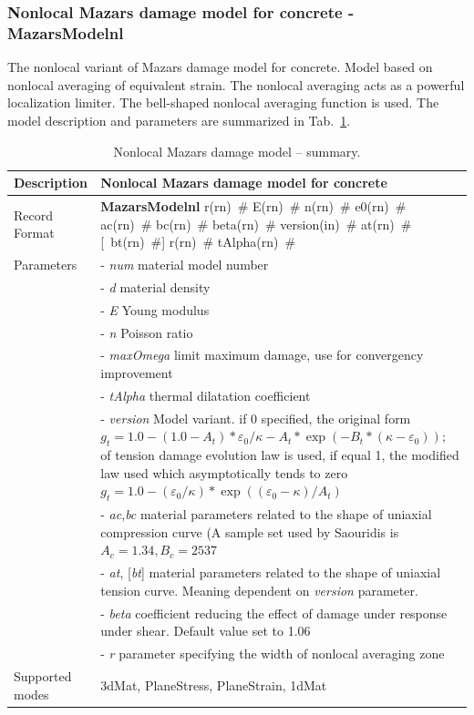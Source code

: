 \documentclass[a4paper]{article}
\newcommand{\descitem}[1]{{\noindent \bf #1}}
\newcommand{\elemparam}[2]{{{#1\tiny (#2)}~\#}}
\newcommand{\optelemparam}[2]{[{~\elemparam{#1}{#2}}]}
\newcommand{\param}[1]{{\it #1}}
\newcommand{\optparam}[1]{[{\it #1}]}
\begin{document}
\subsubsection{Nonlocal Mazars damage model for concrete - MazarsModelnl}
The nonlocal variant of Mazars damage model for concrete.
Model based on nonlocal averaging of equivalent strain.
The nonlocal averaging acts as a powerful localization
limiter. The bell-shaped nonlocal averaging function is used.
The model description and parameters are summarized
in Tab.~\ref{maznl_table}.

\begin{table}[!htb]
\begin{tabular}{|l|p{9cm}|}
\hline
Description & Nonlocal Mazars damage model for concrete\\
\hline
Record Format & \descitem{MazarsModelnl} \elemparam{r}{rn} \elemparam{E}{rn}
\elemparam{n}{rn}  \elemparam{e0}{rn}
\elemparam{ac}{rn} \elemparam{bc}{rn} \elemparam{beta}{rn}
\elemparam{version}{in} \elemparam{at}{rn} \optelemparam{bt}{rn} \elemparam{r}{rn}
\elemparam{tAlpha}{rn} \\
Parameters &- \param{num} material model number\\
&- \param{d} material density\\
&- \param{E} Young modulus\\
&- \param{n} Poisson ratio\\
&- \param{maxOmega} limit maximum damage, use for convergency improvement\\
&- \param{tAlpha} thermal dilatation coefficient\\
&- \param{version} Model variant. if 0 specified, the original form
$g_t= 1.0-(1.0-A_t)*\varepsilon_0/\kappa - A_t*\exp(-B_t*(\kappa-\varepsilon_0));
$ of
tension damage evolution law is used, if equal 1, the modified law
used which asymptotically tends to zero
$g_t = 1.0-(\varepsilon_0/\kappa)*\exp((\varepsilon_0-\kappa)/A_t)$\\
&- \param{ac},\param{bc} material parameters related to the shape of
uniaxial compression curve (A sample set used by Saouridis is $A_c =
1.34, B_c = 2537$\\
&- \param{at}, \optparam{bt} material parameters related to the shape of
uniaxial tension curve. Meaning dependent on \param{version}
parameter.\\
&- \param{beta} coefficient reducing the effect of damage under
response under shear. Default value set to 1.06\\
&- \param{r} parameter specifying the width of nonlocal averaging zone\\
Supported modes& 3dMat, PlaneStress, PlaneStrain, 1dMat\\
\hline
\end{tabular}
\caption{Nonlocal Mazars damage model  -- summary.}
\label{maznl_table}
\end{table}
\end{document}
